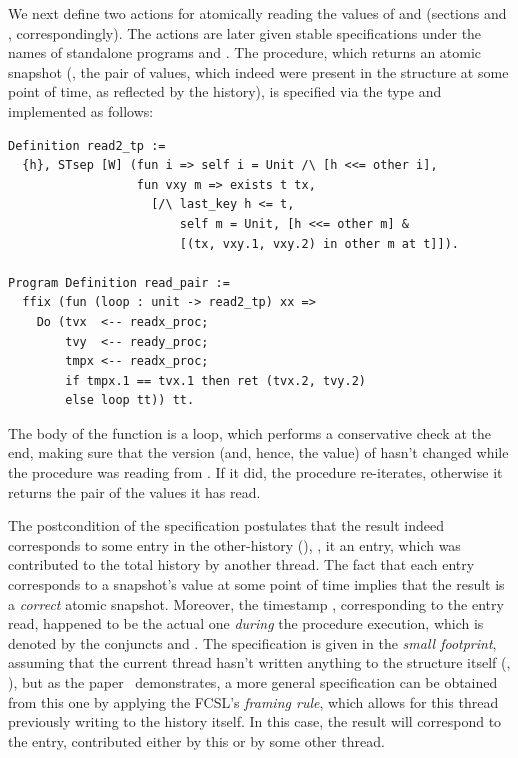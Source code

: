 We next define two actions for atomically reading the values of
 and  (sections  and ,
correspondingly). The actions are later given stable specifications
under the names of standalone programs  and
. The procedure, which returns an atomic snapshot
(\ie, the pair of values, which indeed were present in the structure
at some point of time, as reflected by the history), is specified via
the type  and implemented as follows:

\begin{lstlisting}
Definition read2_tp := 
  {h}, STsep [W] (fun i => self i = Unit /\ [h <<= other i],
                  fun vxy m => exists t tx, 
                    [/\ last_key h <= t, 
                        self m = Unit, [h <<= other m] &
                        [(tx, vxy.1, vxy.2) in other m at t]]).

Program Definition read_pair :=
  ffix (fun (loop : unit -> read2_tp) xx =>
    Do (tvx  <-- readx_proc; 
        tvy  <-- ready_proc;
        tmpx <-- readx_proc;
        if tmpx.1 == tvx.1 then ret (tvx.2, tvy.2)      
        else loop tt)) tt.  
\end{lstlisting}

The body of the function is a loop, which performs a conservative
check at the end, making sure that the version (and, hence, the value)
of  hasn't changed while the procedure was reading from
. If it did, the procedure re-iterates, otherwise it returns
the pair of the values it has read.

The postcondition of the specification  postulates that
the result  indeed corresponds to some entry in the
other-history (), \ie, it an entry, which was
contributed to the total history by another thread. The fact that each
entry corresponds to a snapshot's value at some point of time implies
that the result is a \emph{correct} atomic snapshot. Moreover, the
timestamp , corresponding to the entry read, happened to be
the actual one \emph{during} the procedure execution, which is denoted
by the conjuncts  and \code{[h <<= other
  m]}. The specification is given in the \emph{small footprint},
assuming that the current thread hasn't written anything to the
structure itself (, ), but as the
paper~\cite{Sergey-al:ESOP15} demonstrates, a more general
specification can be obtained from this one by applying the FCSL's
\emph{framing rule}, which allows for this thread previously writing
to the history itself. In this case, the result will correspond to the
entry, contributed either by this or by some other thread.



